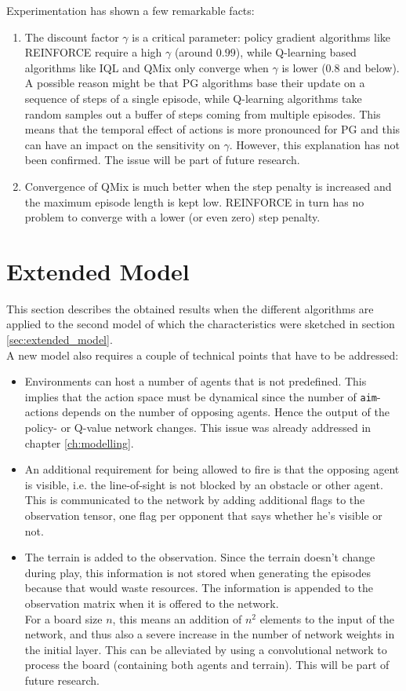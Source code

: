 Experimentation has shown a few remarkable facts:
\begin{enumerate}
    \item The discount factor $\gamma$ is a critical parameter: policy gradient algorithms like REINFORCE require a high $\gamma$ (around $0.99$), while Q-learning based algorithms like IQL and QMix only converge when $\gamma$ is lower ($0.8$ and below). A possible reason might be that PG algorithms base their update on a sequence of steps of a single episode, while Q-learning algorithms take random samples out a buffer of steps coming from multiple episodes. This means that the temporal effect of actions is more pronounced for PG and this can have an impact on the sensitivity on $\gamma$. However, this explanation has not been confirmed. The issue will be part of future research.
    \item Convergence of QMix is much better when the step penalty is increased and the maximum episode length is kept low. REINFORCE in turn has no problem to converge with a lower (or even zero) step penalty.
\end{enumerate}

\section{Extended Model}
\label{sec:init_model_applied}
This section describes the obtained results when the different algorithms are applied to the second model of which the characteristics were sketched in section \ref{sec:extended_model}.\\
A new model also requires a couple of technical points that have to be addressed:
\begin{itemize}
    \item Environments can host a number of agents that is not predefined. This implies that the action space must be dynamical since the number of {\tt aim}-actions depends on the number of opposing agents. Hence the output of the policy- or Q-value network changes. This issue was already addressed in chapter \ref{ch:modelling}.
    \item An additional requirement for being allowed to fire is that the opposing agent is visible, i.e. the line-of-sight is not blocked by an obstacle or other agent. This is communicated to the network by adding additional flags to the observation tensor, one flag per opponent that says whether he's visible or not.
    \item The terrain is added to the observation. Since the terrain doesn't change during play, this information is not stored when generating the episodes because that would waste resources. The information is appended to the observation matrix when it is offered to the network.\\
    For a board size $n$, this means an addition of $n^2$ elements to the input of the network, and thus also a severe increase in the number of network weights in the initial layer. This can be alleviated by using a convolutional network to process the board (containing both agents and terrain). This will be part of future research.
\end{itemize}

